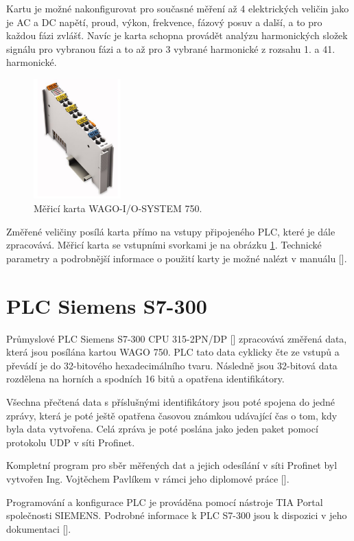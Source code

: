 Kartu je možné nakonfigurovat pro současné měření až 4 elektrických veličin jako je AC a DC napětí, proud, výkon, frekvence, fázový posuv a další, a to pro každou fázi zvlášť. Navíc je karta schopna provádět analýzu harmonických složek signálu pro vybranou fázi a to až pro 3 vybrané harmonické z rozsahu 1. a 41. harmonické. 

\begin{figure}[ht]
    \includegraphics[width=0.3\textwidth]{wago_obr}
    \caption{Měřicí karta WAGO-I/O-SYSTEM 750.}
    \label{wago_pic}
\end{figure}

Změřené veličiny posílá karta přímo na vstupy připojeného PLC, které je dále zpracovává. Měřicí karta se vstupními svorkami je na obrázku \ref{wago_pic}. Technické parametry a podrobnější informace o použití karty je možné nalézt v manuálu [\cite{wago}].

\section{PLC Siemens S7-300}

Průmyslové PLC Siemens S7-300 CPU 315-2PN/DP [\cite{siemens_plc}] zpracovává změřená data, která jsou posílána kartou WAGO 750. PLC tato data cyklicky čte ze vstupů a převádí je do 32-bitového hexadecimálního tvaru. Následně jsou 32-bitová data rozdělena na horních a spodních 16 bitů a opatřena identifikátory. 

Všechna přečtená data s příslušnými identifikátory jsou poté spojena do jedné zprávy, která je poté ještě opatřena časovou známkou udávající čas o tom, kdy byla data vytvořena. Celá zpráva je poté poslána jako jeden paket pomocí protokolu UDP v síti Profinet.  

Kompletní program pro sběr měřených dat a jejich odesílání v síti Profinet byl vytvořen Ing. Vojtěchem Pavlíkem v rámci jeho diplomové práce [\cite{vojtech_pavlik}]. 

Programování a konfigurace PLC je prováděna pomocí nástroje TIA Portal společnosti SIEMENS. Podrobné informace k PLC S7-300 jsou k dispozici v jeho dokumentaci [\cite{siemens_plc}].  

